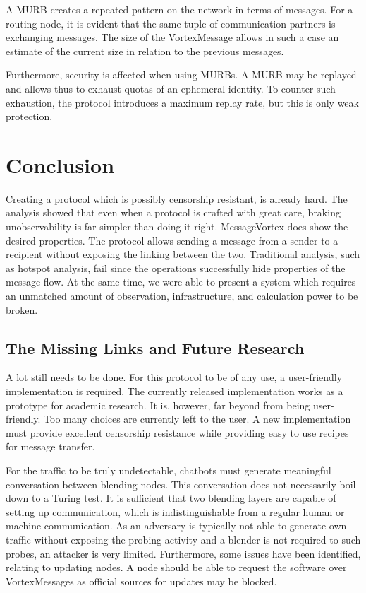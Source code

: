 \documentclass[10pt,journal,compsoc,twocolumn,twoside]{IEEEtran}
\begin{document}
A MURB creates a repeated pattern on the network in terms of messages. For a routing node, it is evident that the same tuple of communication partners is exchanging messages. The size of the VortexMessage allows in such a case an estimate of the current size in relation to the previous messages.

Furthermore, security is affected when using MURBs. A MURB may be replayed and allows thus to exhaust quotas of an ephemeral identity. To counter such exhaustion, the protocol introduces a maximum replay rate, but this is only weak protection.

\section{Conclusion}
Creating a protocol which is possibly censorship resistant, is already hard. The analysis showed that even when a protocol is crafted with great care, braking unobservability is far simpler than doing it right. MessageVortex does show the desired properties. The protocol allows sending a message from a sender to a recipient without exposing the linking between the two. Traditional analysis, such as hotspot analysis, fail since the operations successfully hide properties of the message flow. At the same time, we were able to present a system which requires an unmatched amount of observation, infrastructure, and calculation power to be broken.

\subsection{The Missing Links and Future Research}
A lot still needs to be done. For this protocol to be of any use, a user-friendly implementation is required. The currently released implementation works as a prototype for academic research. It is, however, far beyond from being user-friendly. Too many choices are currently left to the user. A new implementation must provide excellent censorship resistance while providing easy to use recipes for message transfer.  

For the traffic to be truly undetectable, chatbots must generate meaningful conversation between blending nodes. This conversation does not necessarily boil down to a Turing test. It is sufficient that two blending layers are capable of setting up communication, which is indistinguishable from a regular human or machine communication. As an adversary is typically not able to generate own traffic without exposing the probing activity and a blender is not required to such probes, an attacker is very limited. Furthermore, some issues have been identified, relating to updating nodes. A node should be able to request the software over VortexMessages as official sources for updates may be blocked. 
\end{document}
